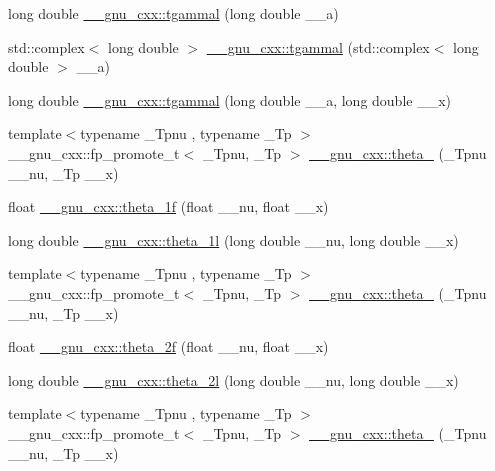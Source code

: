 \begin{DoxyCompactItemize}
long double \hyperlink{group__mathsf__gnu_ga2c7d954852d84665aabd43566d67e344}{\+\_\+\+\_\+gnu\+\_\+cxx\+::tgammal} (long double \+\_\+\+\_\+a)
\item 
std\+::complex$<$ long double $>$ \hyperlink{group__mathsf__gnu_ga8d53515dba9c860fd6058a4b75aaff58}{\+\_\+\+\_\+gnu\+\_\+cxx\+::tgammal} (std\+::complex$<$ long double $>$ \+\_\+\+\_\+a)
\item 
long double \hyperlink{group__mathsf__gnu_gabebff9ffba6acf55f3a3cd716ef5007a}{\+\_\+\+\_\+gnu\+\_\+cxx\+::tgammal} (long double \+\_\+\+\_\+a, long double \+\_\+\+\_\+x)
\item 
{\footnotesize template$<$typename \+\_\+\+Tpnu , typename \+\_\+\+Tp $>$ }\\\+\_\+\+\_\+gnu\+\_\+cxx\+::fp\+\_\+promote\+\_\+t$<$ \+\_\+\+Tpnu, \+\_\+\+Tp $>$ \hyperlink{group__mathsf__gnu_gaa2e5a3a5f550fe032a596a8b01c878c0}{\+\_\+\+\_\+gnu\+\_\+cxx\+::theta\+\_} (\+\_\+\+Tpnu \+\_\+\+\_\+nu, \+\_\+\+Tp \+\_\+\+\_\+x)
\item 
float \hyperlink{group__mathsf__gnu_ga5bbf256b875da28132f9049f5984cb14}{\+\_\+\+\_\+gnu\+\_\+cxx\+::theta\+\_\+1f} (float \+\_\+\+\_\+nu, float \+\_\+\+\_\+x)
\item 
long double \hyperlink{group__mathsf__gnu_ga3520684c78771ffa57180060c8b6d1ca}{\+\_\+\+\_\+gnu\+\_\+cxx\+::theta\+\_\+1l} (long double \+\_\+\+\_\+nu, long double \+\_\+\+\_\+x)
\item 
{\footnotesize template$<$typename \+\_\+\+Tpnu , typename \+\_\+\+Tp $>$ }\\\+\_\+\+\_\+gnu\+\_\+cxx\+::fp\+\_\+promote\+\_\+t$<$ \+\_\+\+Tpnu, \+\_\+\+Tp $>$ \hyperlink{group__mathsf__gnu_ga16f278edeb2842d614bae1f1ae2d0256}{\+\_\+\+\_\+gnu\+\_\+cxx\+::theta\+\_} (\+\_\+\+Tpnu \+\_\+\+\_\+nu, \+\_\+\+Tp \+\_\+\+\_\+x)
\item 
float \hyperlink{group__mathsf__gnu_ga78e832796aedf5159b142801e1184392}{\+\_\+\+\_\+gnu\+\_\+cxx\+::theta\+\_\+2f} (float \+\_\+\+\_\+nu, float \+\_\+\+\_\+x)
\item 
long double \hyperlink{group__mathsf__gnu_gac5a30c772d4888442665945e7f3fa017}{\+\_\+\+\_\+gnu\+\_\+cxx\+::theta\+\_\+2l} (long double \+\_\+\+\_\+nu, long double \+\_\+\+\_\+x)
\item 
{\footnotesize template$<$typename \+\_\+\+Tpnu , typename \+\_\+\+Tp $>$ }\\\+\_\+\+\_\+gnu\+\_\+cxx\+::fp\+\_\+promote\+\_\+t$<$ \+\_\+\+Tpnu, \+\_\+\+Tp $>$ \hyperlink{group__mathsf__gnu_ga146c3b8e86991e164d4bf143cda5f0fc}{\+\_\+\+\_\+gnu\+\_\+cxx\+::theta\+\_} (\+\_\+\+Tpnu \+\_\+\+\_\+nu, \+\_\+\+Tp \+\_\+\+\_\+x)

\end{DoxyCompactItemize}
